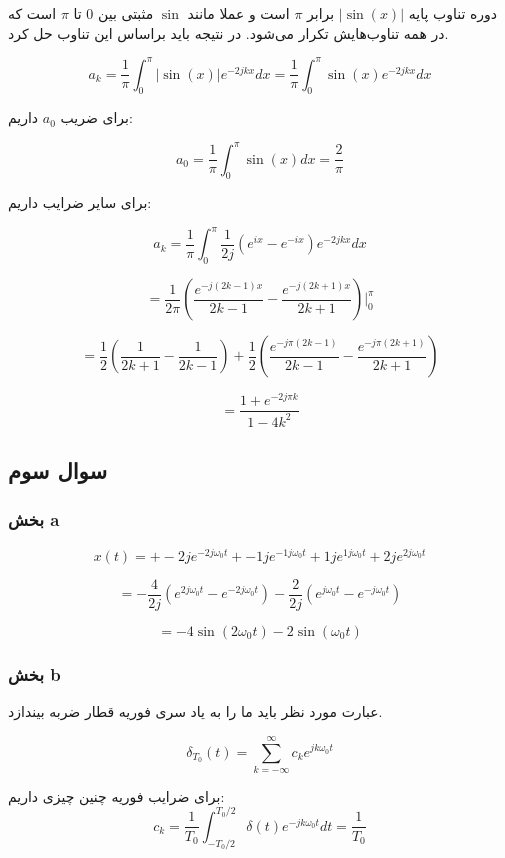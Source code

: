 \documentclass[12pt]{article}
\begin{document}
دوره تناوب پایه $|\sin (x)|$ برابر $\pi$ است و عملا مانند $\sin$ مثبتی بین $0$ تا $\pi$ است که در همه تناوب‌هایش تکرار می‌شود. در نتیجه باید براساس این تناوب حل کرد.

$$a_k = \frac{1}{\pi} \int_{0}^{\pi} |\sin (x)| e^{- 2 j k x} dx = \frac{1}{\pi}\int_{0}^{\pi} \sin (x) e^{- 2 j k x} dx $$

برای ضریب $a_0$ داریم:

$$a_0 = \frac{1}{\pi} \int_{0}^{\pi} \sin (x) dx = \frac{2}{\pi}$$


برای سایر ضرایب داریم:

$$a_k = \frac{1}{\pi}\int_{0}^{\pi} \frac{1}{2 j} (e^{i x} - e^{-ix}) e^{- 2 j k x}  dx$$

$$=\frac{1}{2 \pi} \left(\frac{e^{-j (2 k-1) x}}{2 k-1}-\frac{e^{-j (2 k+1) x}}{2 k+1}\right)|_{0}^{\pi}$$

$$=\frac{1}{2} \left(\frac{1}{2 k+1}-\frac{1}{2 k-1}\right)+\frac{1}{2} \left(\frac{e^{-j \pi  (2 k-1)}}{2 k-1}-\frac{e^{-j \pi  (2 k+1)}}{2 k+1}\right)$$

$$=\boxed{\frac{1+e^{-2 j \pi  k}}{1-4 k^2}}$$

\subsection{سوال سوم}

\subsubsection{بخش a}



$$x(t) = 
+-2j e^{-2j \omega_0 t}
+-1j e^{-1j \omega_0 t}
+1j e^{1j \omega_0 t}
+2j e^{2j \omega_0 t}
$$

$$=
-\frac{4}{2j}(e^{2j \omega_0 t} - e^{-2j \omega_0 t})
-\frac{2}{2j}(e^{j \omega_0 t} - e^{-j \omega_0 t})$$

$$\boxed{= -4 \sin(2 \omega_0 t) -2 \sin( \omega_0 t)}$$


\subsubsection{بخش b}

عبارت مورد نظر باید ما را به یاد سری فوریه قطار ضربه بیندازد.

$$\delta_{T_0} (t) = \sum_{k=-\infty}^{\infty} c_k e^{jk\omega_0 t}$$

برای ضرایب فوریه چنین چیزی داریم:
$$
c_{k}=\frac{1}{T_{0}} \int_{-T_{0} / 2}^{T_{0} / 2} \delta(t) e^{-j k \omega_{0} t} d t=\frac{1}{T_{0}}
$$
\end{document}
